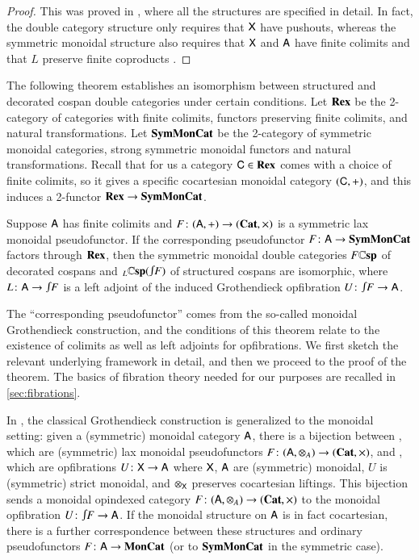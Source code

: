 \documentclass[reqno]{amsart}
\begin{document}
\begin{proof}
This was proved in \cite[Theorems~2.3 \& 3.9]{BC}, where all the structures are specified in detail.  In fact, the double category structure only requires that $\mathsf{X}$ have pushouts, whereas the symmetric monoidal structure also requires that $\mathsf{X}$ and $\mathsf{A}$ have finite colimits and that $L$ preserve finite coproducts \cite[Theorem~3.2.3]{CourserThesis}.
\end{proof}

The following theorem establishes an isomorphism between structured and decorated cospan double categories under certain conditions.  Let $\mathbf{Rex}$ be the 2-category of categories with finite colimits, functors preserving finite colimits, and natural transformations.  Let $\mathbf{SymMonCat}$ be the 2-category of symmetric monoidal categories, strong symmetric monoidal functors and natural transformations.   Recall that for us a category $\mathsf{C} \in \mathbf{Rex}$ comes with a choice of finite colimits, so it gives a specific cocartesian monoidal category $(\mathsf{C},+)$, and this induces a 2-functor $\mathbf{Rex} \to \mathbf{SymMonCat}$.

\begin{thm} \label{thm:equiv}
Suppose $\mathsf{A}$ has finite colimits and $F \colon (\mathsf{A},+) \to (\mathbf{Cat},\times)$ is a symmetric lax monoidal pseudofunctor. If the corresponding pseudofunctor $F \colon \mathsf{A} \to \mathbf{SymMonCat}$ factors through $\mathbf{Rex}$, then the symmetric monoidal double categories $F\mathbf{\mathbb Csp}$ of decorated cospans and $_L\lCsp(\inta F)$ of structured cospans are isomorphic, where $L \maps \A \to \inta F$ is a left adjoint of the induced Grothendieck opfibration $U\maps \inta F \to \A$.
\end{thm}

The ``corresponding pseudofunctor'' comes from the so-called monoidal Grothendieck construction, and the conditions of this theorem relate to the existence of colimits as well as left adjoints for opfibrations. We first sketch the relevant underlying framework in detail, and then we proceed to the proof of the theorem. The basics of fibration theory needed for our purposes are recalled in \cref{sec:fibrations}. 

In \cite{MV}, the classical Grothendieck construction is generalized to the monoidal setting: given a (symmetric) monoidal category $\mathsf{A}$, there is a bijection between , which are (symmetric) lax monoidal pseudofunctors $F\colon (\mathsf{A}, \otimes_A) \to (\mathbf{Cat}, \times)$, and , which are opfibrations $U \colon \mathsf{X} \to \mathsf{A}$ where $\mathsf{X}$, $\mathsf{A}$ are (symmetric) monoidal, $U$ is (symmetric) strict monoidal, and $\otimes_{\mathsf{X}}$ preserves cocartesian liftings.   This bijection sends a monoidal opindexed category $F \colon (\mathsf{A},\otimes_A) \to (\mathbf{Cat}, \times)$ to the monoidal opfibration $U \maps \inta F \to \A$.  If the monoidal structure on $\mathsf{A}$ is in fact cocartesian, there is a further correspondence between these structures and ordinary pseudofunctors $F\colon \mathsf{A} \to \mathbf{MonCat}$ (or to $\mathbf{SymMonCat}$ in the symmetric case). 
\end{document}
